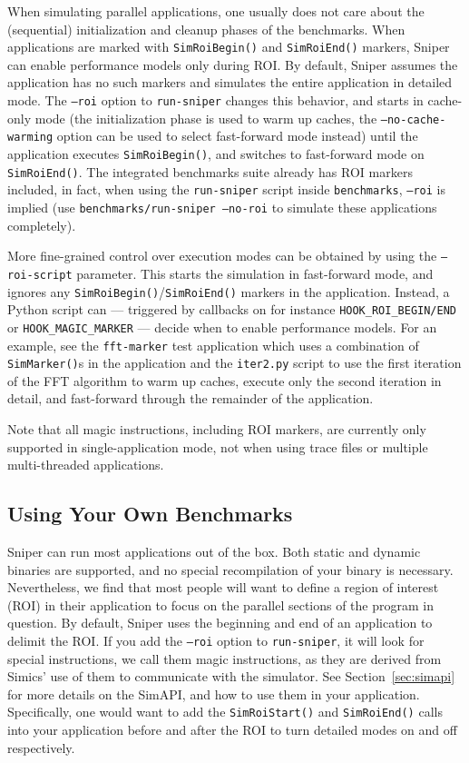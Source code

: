 \documentclass[a4paper,11pt,titlepage]{article}
\newcommand{\sourcecode}[1]{{\tt #1}}
\newcommand{\cmd}[1]{{\tt #1}}
\newcommand{\opt}[1]{{\tt #1}}
\begin{document}
When simulating parallel applications, one usually does not care about the (sequential) initialization
and cleanup phases of the benchmarks. When applications are marked with \opt{SimRoiBegin()} and \opt{SimRoiEnd()}
markers, Sniper can enable performance models only during ROI. By default, Sniper assumes the application
has no such markers and simulates the entire application in detailed mode. The \opt{--roi} option to \cmd{run-sniper}
changes this behavior, and starts in cache-only mode (the initialization phase is used to warm up caches,
the \opt{--no-cache-warming} option can be used to select fast-forward mode instead)
until the application executes \opt{SimRoiBegin()}, and switches to fast-forward mode on \opt{SimRoiEnd()}.
The integrated benchmarks suite already has ROI markers included, in fact, when using the \cmd{run-sniper}
script inside \opt{benchmarks}, \opt{--roi} is implied (use \cmd{benchmarks/run-sniper --no-roi} to simulate these
applications completely).

More fine-grained control over execution modes can be obtained by using the \opt{--roi-script} parameter.
This starts the simulation in fast-forward mode, and ignores any \opt{SimRoiBegin()}/\opt{SimRoiEnd()}
markers in the application. Instead, a Python script can --- triggered by callbacks on for instance 
\opt{HOOK\_ROI\_BEGIN/END} or \opt{HOOK\_MAGIC\_MARKER} --- decide when to enable performance models.
For an example, see the \opt{fft-marker} test application which uses a combination of \opt{SimMarker()}s
in the application and the \opt{iter2.py} script to use the first iteration of the FFT algorithm to warm up caches, 
execute only the second iteration in detail, and fast-forward through the remainder of the application.

Note that all magic instructions, including ROI markers, are currently only supported in single-application mode,
not when using trace files or multiple multi-threaded applications.


\subsection{Using Your Own Benchmarks}

Sniper can run most applications out of the box.  Both static and dynamic binaries are supported, and no special recompilation
of your binary is necessary.  Nevertheless, we find that most people will want to define a region of interest (ROI) in their
application to focus on the parallel sections of the program in question.  By default, Sniper uses the beginning and end of an
application to delimit the ROI.  If you add the \cmd{--roi} option to \cmd{run-sniper}, it will look for special instructions,
we call them magic instructions, as they are derived from Simics' use of them to communicate with the simulator. See
Section~\ref{sec:simapi} for more details on the SimAPI, and how to use them in your application.  Specifically, one would
want to add the \sourcecode{SimRoiStart()} and \sourcecode{SimRoiEnd()} calls into your application before and after the ROI
to turn detailed modes on and off respectively.
\end{document}
